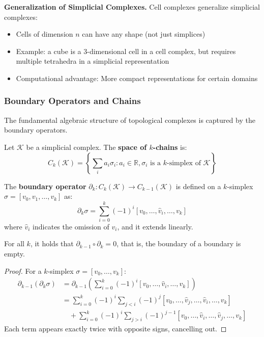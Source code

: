 \textbf{Generalization of Simplicial Complexes.}\label{rem:celular_vs_simplicial} Cell complexes generalize simplicial complexes:
\begin{itemize}
    \item Cells of dimension $n$ can have any shape (not just simplices)
    \item Example: a cube is a 3-dimensional cell in a cell complex, but requires multiple tetrahedra in a simplicial representation
    \item Computational advantage: More compact representations for certain domains
\end{itemize}

\subsubsection{Boundary Operators and Chains}

The fundamental algebraic structure of topological complexes is captured by the boundary operators.

\begin{definition}\label{def:cadenas_frontera}
Let $\mathcal{K}$ be a simplicial complex. The \textbf{space of $k$-chains} is:
\[C_k(\mathcal{K}) = \left\{\sum_{i} a_i \sigma_i : a_i \in \mathbb{R}, \sigma_i \text{ is a } k\text{-simplex of } \mathcal{K}\right\}\]

The \textbf{boundary operator} $\partial_k: C_k(\mathcal{K}) \to C_{k-1}(\mathcal{K})$ is defined on a $k$-simplex $\sigma = [v_0, v_1, \ldots, v_k]$ as:
\[\partial_k \sigma = \sum_{i=0}^k (-1)^i [v_0, \ldots, \hat{v}_i, \ldots, v_k]\]
where $\hat{v}_i$ indicates the omission of $v_i$, and it extends linearly.
\end{definition}

\begin{theorem}[Fundamental Property: $\partial^2 = 0$]\label{thm:partial_squared}
For all $k$, it holds that $\partial_{k-1} \circ \partial_k = 0$, that is, the boundary of a boundary is empty.
\end{theorem}

\begin{proof}
For a $k$-simplex $\sigma = [v_0, \ldots, v_k]$:
\begin{align}
\partial_{k-1}(\partial_k \sigma) &= \partial_{k-1}\left(\sum_{i=0}^k (-1)^i [v_0, \ldots, \hat{v}_i, \ldots, v_k]\right) \\
&= \sum_{i=0}^k (-1)^i \sum_{j<i} (-1)^j [v_0, \ldots, \hat{v}_j, \ldots, \hat{v}_i, \ldots, v_k] \\
&\quad + \sum_{i=0}^k (-1)^i \sum_{j>i} (-1)^{j-1} [v_0, \ldots, \hat{v}_i, \ldots, \hat{v}_j, \ldots, v_k]
\end{align}
Each term appears exactly twice with opposite signs, cancelling out.
\end{proof}

